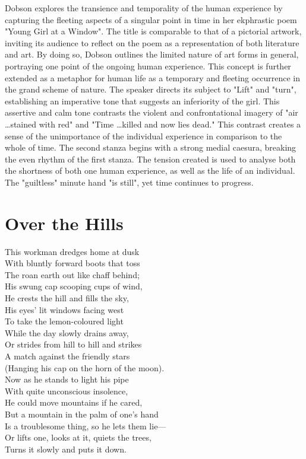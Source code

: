 	Dobson explores the transience and temporality of the human experience by capturing the fleeting aspects of a singular point in time in her ekphrastic poem "Young Girl at a Window". The title is comparable to that of a pictorial artwork, inviting its audience to reflect on the poem as a representation of both literature and art. By doing so, Dobson outlines the limited nature of art forms in general, portraying one point of the ongoing human experience. This concept is further extended as a metaphor for human life as a temporary and fleeting occurrence in the grand scheme of nature. The speaker directs its subject to "Lift" and "turn", establishing an imperative tone that suggests an inferiority of the girl. This assertive and calm tone contrasts the violent and confrontational imagery of "air \dots stained with red" and "Time \dots killed and now lies dead." This contrast creates a sense of the unimportance of the individual experience in comparison to the whole of time. The second stanza begins with a strong medial caesura, breaking the even rhythm of the first stanza. The tension created is used to analyse both the shortness of both one human experience, as well as the life of an individual. The "guiltless" minute hand "is still", yet time continues to progress.

\section{Over the Hills} \label{6/11/2024}
	This workman dredges home at dusk \\
	With bluntly forward boots that toss \\
	The roan earth out like chaff behind; \\
	His swung cap scooping cups of wind, \\
	He crests the hill and fills the sky, \\
	His eyes' lit windows facing west \\
	To take the lemon-coloured light \\
	While the day slowly drains away, \\
	Or strides from hill to hill and strikes \\
	A match against the friendly stars \\
	(Hanging his cap on the horn of the moon). \\
	Now as he stands to light his pipe \\
	With quite unconscious insolence, \\
	He could move mountains if he cared, \\
	But a mountain in the palm of one's hand \\
	Is a troublesome thing, so he lets them lie— \\
	Or lifts one, looks at it, quiets the trees, \\
	Turns it slowly and puts it down.

